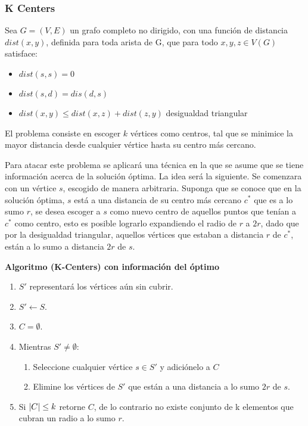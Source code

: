 \documentclass[../np-approximations.tex]{subfiles}
\begin{document}
\subsubsection{K Centers}

\begin{statement}
	Sea $G=(V,E)$ un grafo completo no dirigido, con una función de 
	distancia $dist(x,y)$, definida para toda arista de G, que para 
	todo $x,y,z \in V(G)$ satisface:
	\begin{itemize}
		\item $dist(s,s) = 0$
		\item $dist(s,d) = dis(d,s)$
		\item $dist(x,y) \le dist(x,z) + dist(z,y)$
		      \quad desigualdad triangular
	\end{itemize}
	El problema consiste en escoger $k$ vértices como centros, tal 
	que se minimice la mayor distancia desde cualquier vértice 
	hasta su centro más cercano.
\end{statement}

Para atacar este problema se aplicará una técnica en la que se 
asume que se tiene información acerca de la solución óptima. La 
idea será la siguiente. Se comenzara con un vértice $s$, escogido 
de manera arbitraria. Suponga que se conoce que en la solución 
óptima, $s$ está a una distancia de su centro más cercano $c^*$ que 
es a lo sumo $r$, se desea escoger a $s$ como nuevo centro de 
aquellos puntos que tenían a $c^*$ como centro, esto es posible 
lograrlo expandiendo el radio de $r$ a $2r$, dado que por la 
desigualdad triangular, aquellos vértices que estaban a distancia 
$r$ de $c^*$, están a lo sumo a distancia $2r$ de $s$.

\bigskip
\begin{tcolorbox}
	\textbf{Algoritmo (K-Centers) con información del óptimo}
	\begin{enumerate}
		\item $S'$ representará los vértices aún sin cubrir.
		\item $S' \leftarrow S$.
		\item $C=\emptyset$.
		\item Mientras $S' \neq \emptyset$:
		      \begin{enumerate}
		      	\item Seleccione cualquier vértice $s\in S'$ y adiciónelo a $C$
		      	\item Elimine los vértices de $S'$ que están a una distancia a lo sumo $2r$ de $s$.
		      \end{enumerate}
		\item Si $\left \vert C \right \vert\le k$ retorne $C$, de lo contrario no existe conjunto de k elementos que cubran un radio a lo sumo $r$.
	\end{enumerate}
\end{tcolorbox}
\bigskip
\end{document}

